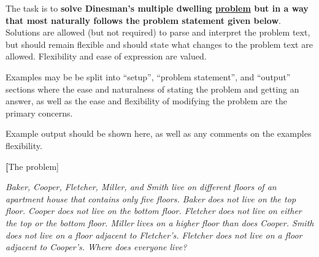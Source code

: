 The task is to \textbf{solve Dinesman's multiple dwelling
\href{http://www-mitpress.mit.edu/sicp/full-text/book/book-Z-H-28.html\#\%\_sec\_4.3.2}{problem}
but in a way that most naturally follows the problem statement given
below}. Solutions are allowed (but not required) to parse and interpret
the problem text, but should remain flexible and should state what
changes to the problem text are allowed. Flexibility and ease of
expression are valued.

Examples may be be split into ``setup'', ``problem statement'', and
``output'' sections where the ease and naturalness of stating the
problem and getting an answer, as well as the ease and flexibility of
modifying the problem are the primary concerns.

Example output should be shown here, as well as any comments on the
examples flexibility.

\textbf[The problem] 

\emph{Baker, Cooper, Fletcher, Miller, and Smith live on different
floors of an apartment house that contains only five floors. Baker does
not live on the top floor. Cooper does not live on the bottom floor.
Fletcher does not live on either the top or the bottom floor. Miller
lives on a higher floor than does Cooper. Smith does not live on a floor
adjacent to Fletcher's. Fletcher does not live on a floor adjacent to
Cooper's. Where does everyone live?}


